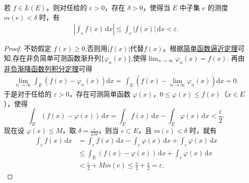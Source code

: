 \documentclass[../../main.tex]{subfiles}%
\begin{document}
\begin{theorem}[积分的绝对连续性]\label{theorem:积分的绝对连续性}
若 $f \in L(E)$，则对任给的 $\varepsilon > 0$，存在 $\delta > 0$，使得当 $E$ 中子集 $e$ 的测度 $m(e) < \delta$ 时，有
\begin{align*}
\left| \int_e f(x) \, \mathrm{d}x \right| \leqslant \int_e |f(x)| \, \mathrm{d}x < \varepsilon.
\end{align*}
\end{theorem}
\begin{proof}

不妨假定 $f(x) \geqslant 0$,否则用$|f(x)|$代替$f(x)$。根据\hyperref[theorem:简单函数逼近定理]{简单函数逼近定理}可知,存在非负简单可测函数渐升列$\{\varphi_n(x)\}$,使得$\lim_{n\to \infty}\varphi_n(x)=f(x).$
再由\hyperref[corollary:非负渐降函数列积分定理]{非负渐降函数列积分定理}可得
\begin{align*}
\underset{n\rightarrow \infty}{\lim}\int_E{\left( f\left( x \right) -\varphi _n\left( x \right) \right) \mathrm{d}x}=\,\int_E{\left( f\left( x \right) -\underset{n\rightarrow \infty}{\lim}\varphi _n\left( x \right) \right) \mathrm{d}x}=0.
\end{align*}
于是对于任给的 $\varepsilon > 0$，存在可测简单函数 $\varphi(x)$，$0 \leqslant \varphi(x) \leqslant f(x)$（$x \in E$），使得
\[
\int_E (f(x) - \varphi(x)) \, \mathrm{d}x = \int_E f(x) \, \mathrm{d}x - \int_E \varphi(x) \, \mathrm{d}x < \frac{\varepsilon}{2}.
\]
现在设 $\varphi(x) \leqslant M$，取 $\delta = \frac{\varepsilon}{2M}$，则当 $e \subset E$，且 $m(e) < \delta$ 时，就有
\begin{align*}
\int_e f(x) \, \mathrm{d}x &= \int_e f(x) \, \mathrm{d}x - \int_e \varphi(x) \, \mathrm{d}x + \int_e \varphi(x) \, \mathrm{d}x \\
&\leqslant \int_E (f(x) - \varphi(x)) \, \mathrm{d}x + \int_e \varphi(x) \, \mathrm{d}x \\
&< \frac{\varepsilon}{2} + Mm(e) \leqslant \frac{\varepsilon}{2} + \frac{\varepsilon}{2} = \varepsilon.
\end{align*}

\end{proof}
\end{document}
